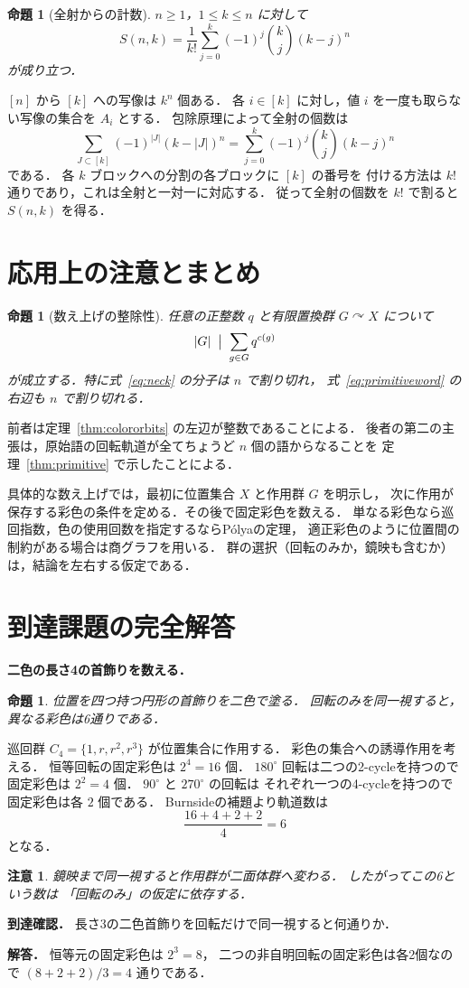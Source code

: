 \documentclass[a5paper,10pt,onecolumn]{jsarticle}
\makeatletter
\theoremstyle{mathnotetheorem}
\newtheorem{proposition}[theorem]{命題}
\newtheorem{remark}[theorem]{注意}
\renewcommand{\proofname}{証明}
\renewenvironment{proof}[1][\proofname]{%
  \par\pushQED{\qed}\normalfont\topsep4\p@\@plus2\p@\relax
  \trivlist\item[\hskip\labelsep\bfseries #1]\ignorespaces
}{\popQED\endtrivlist\@endpefalse}
\makeatother
\begin{document}
\begin{proposition}[全射からの計数]
$n\ge1$，$1\le k\le n$ に対して
\[
 S(n,k)=\frac1{k!}\sum_{j=0}^k(-1)^j
 {k\choose j}(k-j)^n
\]
が成り立つ．
\end{proposition}
\begin{proof}
$[n]$ から $[k]$ への写像は $k^n$ 個ある．
各 $i\in[k]$ に対し，値 $i$ を一度も取らない写像の集合を $A_i$ とする．
包除原理によって全射の個数は
\[
 \sum_{J\subset[k]}(-1)^{|J|}(k-|J|)^n
 =\sum_{j=0}^k(-1)^j{k\choose j}(k-j)^n
\]
である．
各 $k$ ブロックへの分割の各ブロックに $[k]$ の番号を
付ける方法は $k!$ 通りであり，これは全射と一対一に対応する．
従って全射の個数を $k!$ で割ると $S(n,k)$ を得る．
\end{proof}

\section{応用上の注意とまとめ}
\begin{proposition}[数え上げの整除性]
任意の正整数 $q$ と有限置換群 $G\curvearrowright X$ について
\[
 |G|\;\bigm|\;\sum_{g\in G}q^{c(g)}
\]
が成立する．特に式~\eqref{eq:neck} の分子は $n$ で割り切れ，
式~\eqref{eq:primitiveword} の右辺も $n$ で割り切れる．
\end{proposition}
\begin{proof}
前者は定理~\ref{thm:colororbits} の左辺が整数であることによる．
後者の第二の主張は，原始語の回転軌道が全てちょうど $n$ 個の語からなることを
定理~\ref{thm:primitive} で示したことによる．
\end{proof}

具体的な数え上げでは，最初に位置集合 $X$ と作用群 $G$ を明示し，
次に作用が保存する彩色の条件を定める．その後で固定彩色を数える．
単なる彩色なら巡回指数，色の使用回数を指定するならP\'olyaの定理，
適正彩色のように位置間の制約がある場合は商グラフを用いる．
群の選択（回転のみか，鏡映も含むか）は，結論を左右する仮定である．


\section{到達課題の完全解答}
\noindent\textbf{二色の長さ4の首飾りを数える．}
\begin{proposition}
位置を四つ持つ円形の首飾りを二色で塗る．
回転のみを同一視すると，異なる彩色は6通りである．
\end{proposition}
\begin{proof}
巡回群 $C_4=\{1,r,r^2,r^3\}$ が位置集合に作用する．
彩色の集合への誘導作用を考える．
恒等回転の固定彩色は $2^4=16$ 個．
$180^\circ$ 回転は二つの2-cycleを持つので
固定彩色は $2^2=4$ 個．
$90^\circ$ と $270^\circ$ の回転は
それぞれ一つの4-cycleを持つので
固定彩色は各 $2$ 個である．
Burnsideの補題より軌道数は
\[
\frac{16+4+2+2}{4}=6
\]
となる．
\end{proof}
\begin{remark}
鏡映まで同一視すると作用群が二面体群へ変わる．
したがってこの6という数は
「回転のみ」の仮定に依存する．
\end{remark}
\noindent\textbf{到達確認．}
長さ3の二色首飾りを回転だけで同一視すると何通りか．
\par\noindent\textbf{解答．}
恒等元の固定彩色は $2^3=8$，
二つの非自明回転の固定彩色は各2個なので
$(8+2+2)/3=4$ 通りである．
\end{document}
